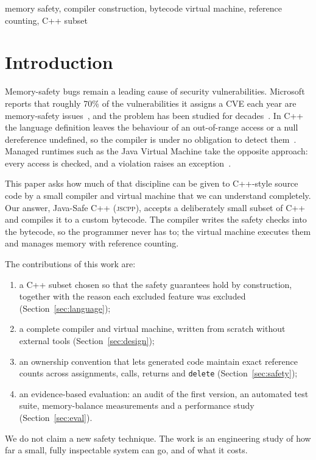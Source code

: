 \documentclass[conference]{IEEEtran}
\newcommand{\jscpp}{\textsc{jscpp}}
\begin{document}
\begin{IEEEkeywords}
memory safety, compiler construction, bytecode virtual machine, reference counting, C++ subset
\end{IEEEkeywords}

\section{Introduction}
Memory-safety bugs remain a leading cause of security vulnerabilities. Microsoft reports that roughly 70\% of the
vulnerabilities it assigns a CVE each year are memory-safety issues~\cite{msrc2019}, and the problem has been
studied for decades~\cite{szekeres2013}. In C++ the language definition leaves the behaviour of an out-of-range
access or a null dereference undefined, so the compiler is under no obligation to detect them~\cite{iso14882}.
Managed runtimes such as the Java Virtual Machine take the opposite approach: every access is checked, and a
violation raises an exception~\cite{lindholm2021}.

This paper asks how much of that discipline can be given to C++-style source code by a small compiler and virtual
machine that we can understand completely. Our answer, Java-Safe C++ (\jscpp), accepts a deliberately small
subset of C++ and compiles it to a custom bytecode. The compiler writes the safety checks into the bytecode, so the
programmer never has to; the virtual machine executes them and manages memory with reference counting.

The contributions of this work are:
\begin{enumerate}
\item a C++ subset chosen so that the safety guarantees hold by construction, together with the reason each
      excluded feature was excluded (Section~\ref{sec:language});
\item a complete compiler and virtual machine, written from scratch without external tools
      (Section~\ref{sec:design});
\item an ownership convention that lets generated code maintain exact reference counts across assignments,
      calls, returns and \texttt{delete} (Section~\ref{sec:safety});
\item an evidence-based evaluation: an audit of the first version, an automated test suite, memory-balance
      measurements and a performance study (Section~\ref{sec:eval}).
\end{enumerate}
We do not claim a new safety technique. The work is an engineering study of how far a small, fully inspectable
system can go, and of what it costs.
\end{document}
